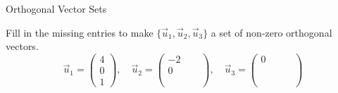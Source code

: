 \begin{frame}{Orthogonal Vector Sets}

    \begin{center}\end{center}
        
    \vspace{4pt} 
    \pause 
    
     Fill in the missing entries to make $ \{\vec u_1 ,\vec u_2, \vec u_3\}$ a set of non-zero orthogonal vectors.
    \begin{equation*}
        \vec u_1 = \begin{pmatrix} 4 \\ 0 \\ 1 \end{pmatrix}, \quad 
        \vec u_2 = \begin{pmatrix}-2 \\ 0 \\    \phantom{-1 - 1 }\end{pmatrix}, \quad 
        \vec u_3 = \begin{pmatrix} 0 \\  \phantom{-1 - 1 } \\ \phantom{-1 - 1 }\end{pmatrix}
    \end{equation*}
\end{frame}


